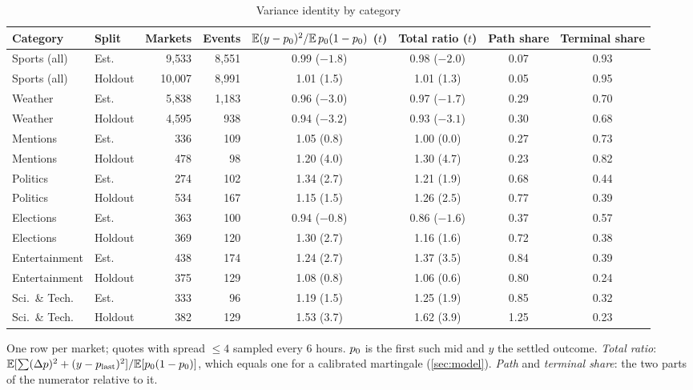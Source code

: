 \begin{table}[ht]
\centering
\begin{threeparttable}
\caption{Variance identity by category}\label{tab:dyn-vi}
\scriptsize
\setlength{\tabcolsep}{3pt}
\begin{tabular}{llrrcccc}
\toprule
Category & Split & Markets & Events & $\mathbb{E}(y-p_0)^2/\mathbb{E}\,p_0(1-p_0)$ ($t$) & Total ratio ($t$) & Path share & Terminal share \\
\midrule
Sports (all) & Est. & 9{,}533 & 8{,}551 & 0.99 ($-1.8$) & 0.98 ($-2.0$) & 0.07 & 0.93 \\
Sports (all) & Holdout & 10{,}007 & 8{,}991 & 1.01 (1.5) & 1.01 (1.3) & 0.05 & 0.95 \\
Weather & Est. & 5{,}838 & 1{,}183 & 0.96 ($-3.0$) & 0.97 ($-1.7$) & 0.29 & 0.70 \\
Weather & Holdout & 4{,}595 & 938 & 0.94 ($-3.2$) & 0.93 ($-3.1$) & 0.30 & 0.68 \\
Mentions & Est. & 336 & 109 & 1.05 (0.8) & 1.00 (0.0) & 0.27 & 0.73 \\
Mentions & Holdout & 478 & 98 & 1.20 (4.0) & 1.30 (4.7) & 0.23 & 0.82 \\
Politics & Est. & 274 & 102 & 1.34 (2.7) & 1.21 (1.9) & 0.68 & 0.44 \\
Politics & Holdout & 534 & 167 & 1.15 (1.5) & 1.26 (2.5) & 0.77 & 0.39 \\
Elections & Est. & 363 & 100 & 0.94 ($-0.8$) & 0.86 ($-1.6$) & 0.37 & 0.57 \\
Elections & Holdout & 369 & 120 & 1.30 (2.7) & 1.16 (1.6) & 0.72 & 0.38 \\
Entertainment & Est. & 438 & 174 & 1.24 (2.7) & 1.37 (3.5) & 0.84 & 0.39 \\
Entertainment & Holdout & 375 & 129 & 1.08 (0.8) & 1.06 (0.6) & 0.80 & 0.24 \\
Sci.\ \& Tech. & Est. & 333 & 96 & 1.19 (1.5) & 1.25 (1.9) & 0.85 & 0.32 \\
Sci.\ \& Tech. & Holdout & 382 & 129 & 1.53 (3.7) & 1.62 (3.9) & 1.25 & 0.23 \\
\bottomrule
\end{tabular}
\begin{tablenotes}[flushleft]\footnotesize
\item One row per market; quotes with spread $\le4$\cents{} sampled every 6 hours. $p_0$ is the first such mid and $y$ the settled outcome. \emph{Total ratio}: $\mathbb{E}[\sum(\Delta p)^2+(y-p_{\text{last}})^2]/\mathbb{E}[p_0(1-p_0)]$, which equals one for a calibrated martingale (\cref{sec:model}). \emph{Path} and \emph{terminal share}: the two parts of the numerator relative to it.

\end{tablenotes}
\end{threeparttable}
\end{table}
